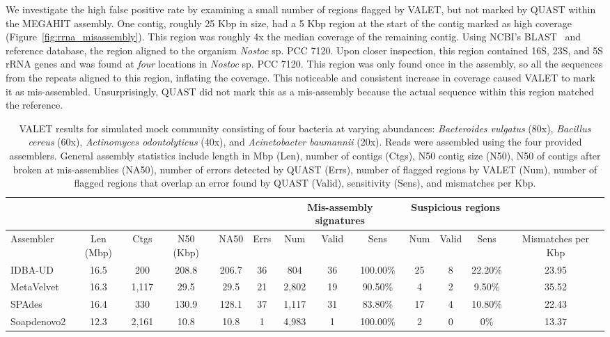 \documentclass[12pt,\mydriver]{thesis}
\begin{document}
We investigate the high false positive rate by examining a small number of regions flagged by VALET, but not marked by QUAST within the MEGAHIT assembly.
One contig, roughly 25 Kbp in size, had a 5 Kbp region at the start of the contig marked as high coverage (Figure~\ref{fig:rrna_misassembly}).
This region was roughly 4x the median coverage of the remaining contig.
Using NCBI's BLAST~\cite{blast} and reference database, the region aligned to the organism \emph{Nostoc} sp. PCC 7120.
Upon closer inspection, this region contained 16S, 23S, and 5S rRNA genes and was found at \emph{four} locations in  \emph{Nostoc} sp. PCC 7120.
This region was only found once in the assembly, so all the sequences from the repeats aligned to this region, inflating the coverage.
This noticeable and consistent increase in coverage caused VALET to mark it as mis-assembled.
Unsurprisingly, QUAST did not mark this as a mis-assembly because the actual sequence within this region matched the reference.

\begin{landscape}
\renewcommand{\baselinestretch}{1}
\small\normalsize
\begin{table}[tb!]
\centering
\small
\begin{tabular}{|l|c|c|c|c|c|c|c|c|c|c|c|c|}
  \hline
  \multicolumn{6}{|c}{} & \multicolumn{3}{|c|}{Mis-assembly signatures} & \multicolumn{3}{c|}{Suspicious regions}   &  \\
  \hline
  Assembler   & Len (Mbp) & Ctgs  & N50 (Kbp) & NA50  & Errs & Num   & Valid & Sens     & Num & Valid & Sens    & Mismatches per Kbp \\
  \hline
  IDBA-UD     & 16.5      & 200   & 208.8     & 206.7 & 36   & 804   & 36    & 100.00\% & 25  & 8     & 22.20\% & 23.95              \\
  MetaVelvet  & 16.3      & 1,117 & 29.5      & 29.5  & 21   & 2,802 & 19    & 90.50\%  & 4   & 2     & 9.50\%  & 35.52              \\
  SPAdes      & 16.4      & 330   & 130.9     & 128.1 & 37   & 1,117 & 31    & 83.80\%  & 17  & 4     & 10.80\% & 22.43              \\
  Soapdenovo2 & 12.3      & 2,161 & 10.8      & 10.8  & 1    & 4,983 & 1     & 100.00\% & 2   & 0     & 0\%     & 13.37 \\
  \hline
\end{tabular}
\caption[VALET results for simulated mock community]{VALET results for simulated mock community consisting of four bacteria at varying abundances: \emph{Bacteroides vulgatus} (80x), \emph{Bacillus cereus} (60x), \emph{Actinomyces odontolyticus} (40x), and \emph{Acinetobacter baumannii} (20x). Reads were assembled using the four provided assemblers. General assembly statistics include length in Mbp (Len), number of contigs (Ctgs), N50 contig size (N50), N50 of contigs after broken at mis-assemblies (NA50), number of errors detected by QUAST (Errs), number of flagged regions by VALET (Num), number of flagged regions that overlap an error found by QUAST (Valid), sensitivity (Sens), and mismatches per Kbp.}
\label{simulated_community}
\end{table}
\renewcommand{\baselinestretch}{2}
\small\normalsize
\end{landscape}
\end{document}
